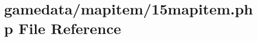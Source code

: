 \hypertarget{15mapitem_8php}{\section{gamedata/mapitem/15mapitem.php File Reference}
\label{15mapitem_8php}
}
